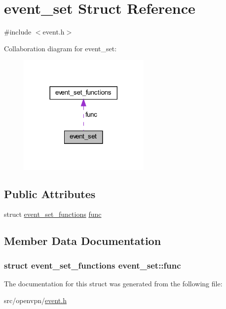 \hypertarget{structevent__set}{}\section{event\+\_\+set Struct Reference}
\label{structevent__set}


{\ttfamily \#include $<$event.\+h$>$}



Collaboration diagram for event\+\_\+set\+:
\nopagebreak
\begin{figure}[H]
\begin{center}
\leavevmode
\includegraphics[width=182pt]{structevent__set__coll__graph}
\end{center}
\end{figure}
\subsection*{Public Attributes}
\begin{DoxyCompactItemize}
\item 
struct \hyperlink{structevent__set__functions}{event\+\_\+set\+\_\+functions} \hyperlink{structevent__set_a795e0256985e7562e32e397709d88f29}{func}
\end{DoxyCompactItemize}


\subsection{Member Data Documentation}
\hypertarget{structevent__set_a795e0256985e7562e32e397709d88f29}{}
\subsubsection[{func}]{\setlength{\rightskip}{0pt plus 5cm}struct {\bf event\+\_\+set\+\_\+functions} event\+\_\+set\+::func}\label{structevent__set_a795e0256985e7562e32e397709d88f29}


The documentation for this struct was generated from the following file\+:\begin{DoxyCompactItemize}
\item 
src/openvpn/\hyperlink{event_8h}{event.\+h}\end{DoxyCompactItemize}
